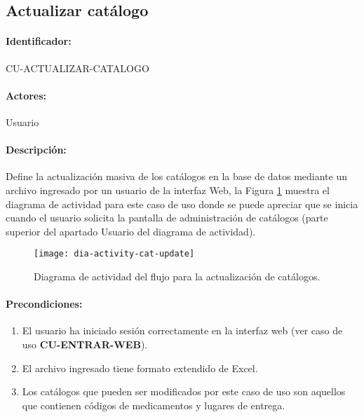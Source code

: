 \subsection{Actualizar catálogo}\label{cu-actualizar-catalogo}
\paragraph{Identificador:}
CU-ACTUALIZAR-CATALOGO
\paragraph{Actores:}
Usuario
\paragraph{Descripción:}
Define la actualización masiva de los catálogos en la base de datos mediante un archivo ingresado por un usuario de la interfaz Web, la Figura \ref{fig:dia-activity-cat-update} muestra el diagrama de actividad para este caso de uso donde se puede apreciar que se inicia cuando el usuario solicita la pantalla de administración de catálogos (parte superior del apartado Usuario del diagrama de actividad).
\begin{figure}[h]
  \centering
  \texttt{[image: dia-activity-cat-update]}
  \caption{Diagrama de actividad del flujo para la actualización de catálogos.}
  \label{fig:dia-activity-cat-update}
\end{figure}
\paragraph{Precondiciones:}
\begin{enumerate}
  \item El usuario ha iniciado sesión correctamente en la interfaz web (ver caso de uso \textbf{CU-ENTRAR-WEB}).
  \item El archivo ingresado tiene formato extendido de Excel\textsuperscript{\textcopyright}.
  \item Los catálogos que pueden ser modificados por este caso de uso son aquellos que contienen códigos de medicamentos y lugares de entrega.
\end{enumerate}
